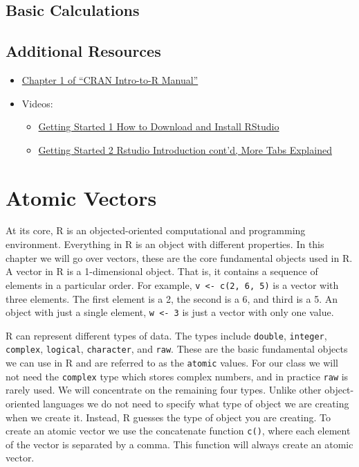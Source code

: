 \documentclass[
]{book}
\providecommand{\tightlist}{%
  \setlength{\itemsep}{0pt}\setlength{\parskip}{0pt}}
\begin{document}
\hypertarget{basic-calculations}{%
\section{Basic Calculations}\label{basic-calculations}}

\hypertarget{additional-resources}{%
\section*{Additional Resources}\label{additional-resources}}

\begin{itemize}
\tightlist
\item
  \href{https://cran.r-project.org/doc/manuals/r-release/R-intro.pdf}{Chapter 1 of ``CRAN Intro-to-R Manual''}
\item
  Videos:

  \begin{itemize}
  \tightlist
  \item
    \href{https://ucr.yuja.com/V/Video?v=2365045\&node=8476457\&a=437885577\&autoplay=1}{Getting Started 1 \textbar{} How to Download and Install RStudio}
  \item
    \href{https://ucr.yuja.com/V/Video?v=2368643\&node=8487538\&a=437248619\&autoplay=1}{Getting Started 2 \textbar{} Rstudio Introduction cont'd, More Tabs Explained}
  \end{itemize}
\end{itemize}

\hypertarget{atomic-vectors}{%
\chapter{Atomic Vectors}\label{atomic-vectors}}

At its core, R is an objected-oriented computational and programming environment. Everything in R is an object with different properties. In this chapter we will go over vectors, these are the core fundamental objects used in R. A vector in R is a 1-dimensional object. That is, it contains a sequence of elements in a particular order. For example, \texttt{v\ \textless{}-\ c(2,\ 6,\ 5)} is a vector with three elements. The first element is a 2, the second is a 6, and third is a 5. An object with just a single element, \texttt{w\ \textless{}-\ 3} is just a vector with only one value.

R can represent different types of data. The types include \texttt{double}, \texttt{integer}, \texttt{complex}, \texttt{logical}, \texttt{character}, and \texttt{raw}. These are the basic fundamental objects we can use in R and are referred to as the \texttt{atomic} values. For our class we will not need the \texttt{complex} type which stores complex numbers, and in practice \texttt{raw} is rarely used. We will concentrate on the remaining four types. Unlike other object-oriented languages we do not need to specify what type of object we are creating when we create it. Instead, R guesses the type of object you are creating. To create an atomic vector we use the concatenate function \texttt{c()}, where each element of the vector is separated by a comma. This function will always create an atomic vector.
\end{document}
